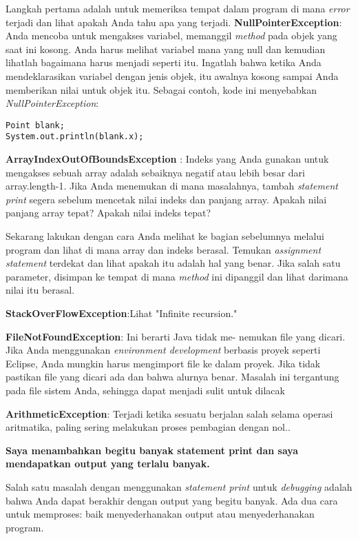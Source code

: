 \noindent Langkah pertama adalah untuk memeriksa tempat dalam program di mana \textit{error} terjadi dan lihat apakah Anda tahu apa yang terjadi.
\textbf{NullPointerException}: Anda mencoba untuk mengakses variabel, memanggil \textit{method} pada objek yang saat ini kosong. Anda harus melihat variabel mana yang null dan kemudian lihatlah bagaimana harus menjadi seperti itu. Ingatlah bahwa ketika Anda mendeklarasikan variabel dengan jenis objek, itu awalnya kosong sampai Anda memberikan nilai untuk objek itu. Sebagai contoh, kode ini menyebabkan \textit{NullPointerException}:
\begin{lstlisting}
Point blank;
System.out.println(blank.x);
\end{lstlisting}

\noindent \textbf{ArrayIndexOutOfBoundsException} : Indeks yang Anda gunakan untuk mengakses sebuah array adalah sebaiknya negatif atau lebih besar dari array.length-1. Jika Anda menemukan di mana masalahnya, tambah \textit{statement print} segera sebelum mencetak nilai indeks dan panjang array. Apakah nilai panjang array tepat? Apakah nilai indeks tepat?

\noindent Sekarang lakukan dengan cara Anda melihat ke bagian sebelumnya melalui program dan lihat di mana array dan indeks berasal. Temukan \textit{assignment statement}  terdekat dan lihat apakah itu adalah hal yang benar. Jika salah satu parameter, disimpan ke tempat di mana \textit{method} ini dipanggil dan lihat darimana nilai itu berasal.

\noindent \textbf{StackOverFlowException}:Lihat "Infinite recursion."

\noindent \textbf{FileNotFoundException}: Ini berarti Java tidak me- nemukan file yang dicari. Jika Anda menggunakan \textit{environment development} berbasis proyek seperti Eclipse, Anda mungkin harus mengimport file ke dalam proyek. Jika tidak pastikan file yang dicari ada dan bahwa alurnya benar. Masalah ini tergantung pada file sistem Anda, sehingga dapat menjadi sulit untuk dilacak

\noindent \textbf{ArithmeticException}: Terjadi ketika sesuatu berjalan salah selama operasi aritmatika, paling sering melakukan proses pembagian dengan nol..

\noindent \textbf{Saya menambahkan begitu banyak statement print dan saya mendapatkan output yang terlalu banyak.}

\noindent Salah satu masalah dengan menggunakan \textit{statement print} untuk \textit{debugging} adalah bahwa Anda dapat berakhir dengan output yang begitu banyak. Ada dua cara untuk memproses: 
baik menyederhanakan output atau menyederhanakan program.


